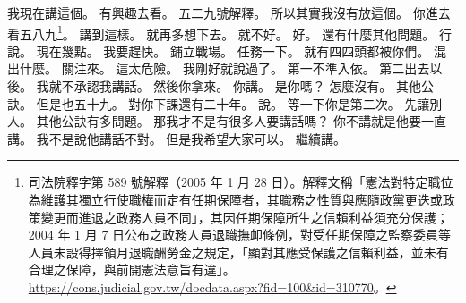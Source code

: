 \hypertarget{c01:cue:3534}{}我現在講這個。
\hypertarget{c01:cue:3535}{}有興趣去看。
\hypertarget{c01:cue:3536}{}五二九號解釋。
\hypertarget{c01:cue:3537}{}所以其實我沒有放這個。
\hypertarget{c01:cue:3538}{}你進去看五八九\footnote{司法院釋字第 589 號解釋（2005 年 1 月 28 日）。解釋文稱「憲法對特定職位為維護其獨立行使職權而定有任期保障者，其職務之性質與應隨政黨更迭或政策變更而進退之政務人員不同」，其因任期保障所生之信賴利益須充分保護；2004 年 1 月 7 日公布之政務人員退職撫卹條例，對受任期保障之監察委員等人員未設得擇領月退職酬勞金之規定，「顯對其應受保護之信賴利益，並未有合理之保障，與前開憲法意旨有違」。\url{https://cons.judicial.gov.tw/docdata.aspx?fid=100&id=310770}。}。
\hypertarget{c01:cue:3539}{}講到這樣。
\hypertarget{c01:cue:3540}{}就再多想下去。
\hypertarget{c01:cue:3541}{}就不好。
\hypertarget{c01:cue:3542}{}好。
\hypertarget{c01:cue:3543}{}還有什麼其他問題。
\hypertarget{c01:cue:3544}{}行說。
\hypertarget{c01:cue:3545}{}現在幾點。
\hypertarget{c01:cue:3546}{}我要趕快。
\hypertarget{c01:cue:3547}{}鋪立戰場。
\hypertarget{c01:cue:3548}{}任務一下。
\hypertarget{c01:cue:3549}{}就有四四頭都被你們。
\hypertarget{c01:cue:3550}{}混出什麼。
\hypertarget{c01:cue:3551}{}關注來。
\hypertarget{c01:cue:3552}{}這太危險。
\hypertarget{c01:cue:3553}{}我剛好就說過了。
\hypertarget{c01:cue:3554}{}第一不準入依。
\hypertarget{c01:cue:3555}{}第二出去以後。
\hypertarget{c01:cue:3556}{}我就不承認我講話。
\hypertarget{c01:cue:3557}{}然後你拿來。
\hypertarget{c01:cue:3558}{}你講。
\hypertarget{c01:cue:3559}{}是你嗎？
\hypertarget{c01:cue:3560}{}怎麼沒有。
\hypertarget{c01:cue:3561}{}其他公訣。
\hypertarget{c01:cue:3562}{}但是也五十九。
\hypertarget{c01:cue:3563}{}對你下課還有二十年。
\hypertarget{c01:cue:3564}{}說。
\hypertarget{c01:cue:3565}{}等一下你是第二次。
\hypertarget{c01:cue:3566}{}先讓別人。
\hypertarget{c01:cue:3567}{}其他公訣有多問題。
\hypertarget{c01:cue:3568}{}那我才不是有很多人要講話嗎？
\hypertarget{c01:cue:3569}{}你不講就是他要一直講。
\hypertarget{c01:cue:3570}{}我不是說他講話不對。
\hypertarget{c01:cue:3571}{}但是我希望大家可以。
\hypertarget{c01:cue:3572}{}繼續講。

